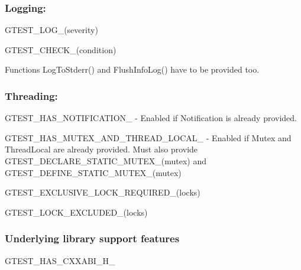 \subsubsection*{Logging\+:}


\begin{DoxyItemize}
\item {\ttfamily G\+T\+E\+S\+T\+\_\+\+L\+O\+G\+\_\+(severity)}
\item {\ttfamily G\+T\+E\+S\+T\+\_\+\+C\+H\+E\+C\+K\+\_\+(condition)}
\item Functions {\ttfamily Log\+To\+Stderr()} and {\ttfamily Flush\+Info\+Log()} have to be provided too.
\end{DoxyItemize}

\subsubsection*{Threading\+:}


\begin{DoxyItemize}
\item {\ttfamily G\+T\+E\+S\+T\+\_\+\+H\+A\+S\+\_\+\+N\+O\+T\+I\+F\+I\+C\+A\+T\+I\+O\+N\+\_\+} -\/ Enabled if Notification is already provided.
\item {\ttfamily G\+T\+E\+S\+T\+\_\+\+H\+A\+S\+\_\+\+M\+U\+T\+E\+X\+\_\+\+A\+N\+D\+\_\+\+T\+H\+R\+E\+A\+D\+\_\+\+L\+O\+C\+A\+L\+\_\+} -\/ Enabled if {\ttfamily Mutex} and {\ttfamily Thread\+Local} are already provided. Must also provide {\ttfamily G\+T\+E\+S\+T\+\_\+\+D\+E\+C\+L\+A\+R\+E\+\_\+\+S\+T\+A\+T\+I\+C\+\_\+\+M\+U\+T\+E\+X\+\_\+(mutex)} and {\ttfamily G\+T\+E\+S\+T\+\_\+\+D\+E\+F\+I\+N\+E\+\_\+\+S\+T\+A\+T\+I\+C\+\_\+\+M\+U\+T\+E\+X\+\_\+(mutex)}
\item {\ttfamily G\+T\+E\+S\+T\+\_\+\+E\+X\+C\+L\+U\+S\+I\+V\+E\+\_\+\+L\+O\+C\+K\+\_\+\+R\+E\+Q\+U\+I\+R\+E\+D\+\_\+(locks)}
\item {\ttfamily G\+T\+E\+S\+T\+\_\+\+L\+O\+C\+K\+\_\+\+E\+X\+C\+L\+U\+D\+E\+D\+\_\+(locks)}
\end{DoxyItemize}

\subsubsection*{Underlying library support features}


\begin{DoxyItemize}
\item {\ttfamily G\+T\+E\+S\+T\+\_\+\+H\+A\+S\+\_\+\+C\+X\+X\+A\+B\+I\+\_\+\+H\+\_\+}
\end{DoxyItemize}


